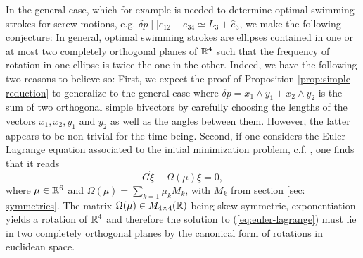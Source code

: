 In the general case, which for example is needed to determine optimal swimming strokes for screw motions, e.g. $\delta p \mid \mid e_{12} + e_{34} \simeq L_3 + \hat{e}_3$, we make the following conjecture: In general, optimal swimming strokes are ellipses contained in one or at most two completely orthogonal planes of $\mathbb{R}^4$ such that the frequency of rotation in one ellipse is twice the one in the other. Indeed, we have the following two reasons to believe so: First, we expect the proof of Proposition \ref{prop:simple reduction} to generalize to the general case where $\delta p = x_1 \wedge y_1 + x_2 \wedge y_2$ is the sum of two orthogonal simple bivectors by carefully choosing the lengths of the vectors $x_1, x_2, y_1$ and $y_2$ as well as the angles between them. However, the latter appears to be non-trivial for the time being. Second, if one considers the Euler-Lagrange equation associated to the initial minimization problem, c.f. \cite{DeSimone2011}, one finds that it reads
\begin{equation}
\label{eq:euler-lagrange}
G \ddot{\xi} - \Omega(\mu) \dot{\xi} = 0,
\end{equation}
where $\mu \in \mathbb{R}^6$ and $\Omega(\mu) = \sum_{k = 1} \mu_k M_k$, with $M_k$ from section \ref{sec: symmetries}. The matrix $\Omega(\mu) \in M_{4 \times 4}(\mathbb{R})$ being skew symmetric, exponentiation yields a rotation of $\mathbb{R}^4$ and therefore the solution to (\ref{eq:euler-lagrange}) must lie in two completely orthogonal planes by the canonical form of rotations in euclidean space.
